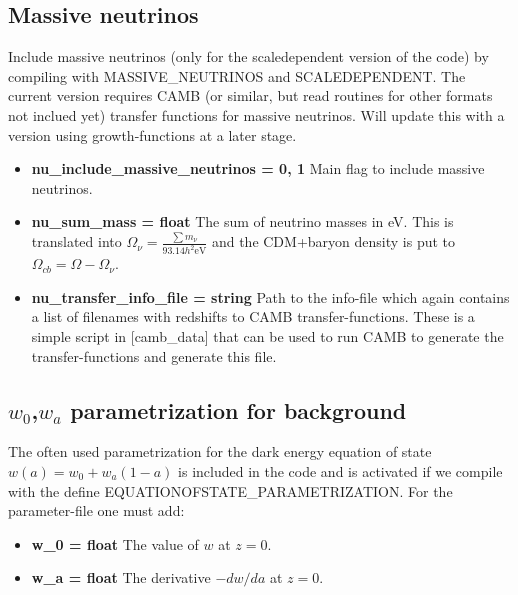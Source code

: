 \documentclass[usenatbib]{article}
\begin{document}
\subsection*{Massive neutrinos}

Include massive neutrinos (only for the scaledependent version of the code) by compiling with MASSIVE\_NEUTRINOS and SCALEDEPENDENT. The current version requires CAMB (or similar, but read routines for other formats not inclued yet) transfer functions for massive neutrinos. Will update this with a version using growth-functions at a later stage.

\begin{itemize}

\item \textbf{nu\_include\_massive\_neutrinos = 0, 1} Main flag to include massive neutrinos.

\item \textbf{nu\_sum\_mass = float} The sum of neutrino masses in eV. This is translated into $\Omega_\nu = \frac{\sum m_\nu}{93.14 h^2 \text{eV}}$ and the CDM+baryon density is put to $\Omega_{cb} = \Omega - \Omega_\nu$.

\item \textbf{nu\_transfer\_info\_file = string} Path to the info-file which again contains a list of filenames with redshifts to CAMB transfer-functions. These is a simple script in [camb\_data] that can be used to run CAMB to generate the transfer-functions and generate this file.

\end{itemize}

\subsection*{$w_0$,$w_a$ parametrization for background}

The often used parametrization for the dark energy equation of state $w(a) = w_0 + w_a(1-a)$ is included in the code and is activated if we compile with the define EQUATIONOFSTATE\_PARAMETRIZATION. For the parameter-file one must add:

\begin{itemize}

\item \textbf{w\_0 = float} The value of $w$ at $z=0$.
\item \textbf{w\_a = float} The derivative $-dw/da$ at $z=0$.

\end{itemize}
\end{document}
